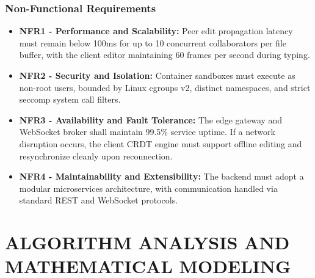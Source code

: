 \documentclass[12pt,a4paper]{report}
\begin{document}
	\subsection{Non-Functional Requirements}
	\begin{itemize}
		\item \textbf{NFR1 - Performance and Scalability:} Peer edit propagation latency must remain below 100ms for up to 10 concurrent collaborators per file buffer, with the client editor maintaining 60 frames per second during typing.
		\item \textbf{NFR2 - Security and Isolation:} Container sandboxes must execute as non-root users, bounded by Linux cgroups v2, distinct namespaces, and strict seccomp system call filters.
		\item \textbf{NFR3 - Availability and Fault Tolerance:} The edge gateway and WebSocket broker shall maintain 99.5\% service uptime. If a network disruption occurs, the client CRDT engine must support offline editing and resynchronize cleanly upon reconnection.
		\item \textbf{NFR4 - Maintainability and Extensibility:} The backend must adopt a modular microservices architecture, with communication handled via standard REST and WebSocket protocols.
	\end{itemize}
	
	\chapter{ALGORITHM ANALYSIS AND MATHEMATICAL MODELING}
	
\end{document}
